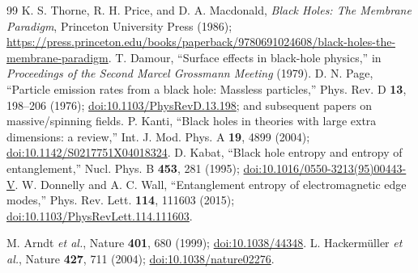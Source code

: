 \documentclass[aps,prx,onecolumn,showpacs,superscriptaddress,longbibliography,nofootinbib]{revtex4-2}
\newcommand{\doilink}[1]{\href{https://doi.org/#1}{doi:#1}}
\begin{document}
\begin{thebibliography}{99}
 K. S. Thorne, R. H. Price, and D. A. Macdonald, \emph{Black Holes: The Membrane Paradigm}, Princeton University Press (1986); \url{https://press.princeton.edu/books/paperback/9780691024608/black-holes-the-membrane-paradigm}.
 T. Damour, ``Surface effects in black-hole physics,'' in \emph{Proceedings of the Second Marcel Grossmann Meeting} (1979).
 D. N. Page, ``Particle emission rates from a black hole: Massless particles,'' Phys. Rev. D \textbf{13}, 198--206 (1976); \doilink{10.1103/PhysRevD.13.198}; and subsequent papers on massive/spinning fields.
 P. Kanti, ``Black holes in theories with large extra dimensions: a review,'' Int. J. Mod. Phys. A \textbf{19}, 4899 (2004); \doilink{10.1142/S0217751X04018324}.
 D. Kabat, ``Black hole entropy and entropy of entanglement,'' Nucl. Phys. B \textbf{453}, 281 (1995); \doilink{10.1016/0550-3213(95)00443-V}.
 W. Donnelly and A. C. Wall, ``Entanglement entropy of electromagnetic edge modes,'' Phys. Rev. Lett. \textbf{114}, 111603 (2015); \doilink{10.1103/PhysRevLett.114.111603}.

 M. Arndt \emph{et al.}, Nature \textbf{401}, 680 (1999); \doilink{10.1038/44348}.
 L. Hackerm\"uller \emph{et al.}, Nature \textbf{427}, 711 (2004); \doilink{10.1038/nature02276}.

\end{thebibliography}
\end{document}
